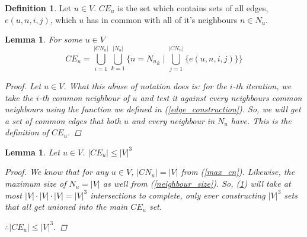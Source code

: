 \documentclass{article}
\theoremstyle{plain}
\newtheorem{lem}[thm]{Lemma}
\theoremstyle{definition}
\newtheorem{defn}{Definition}[]
\theoremstyle{remark}
\newcommand{\cn}[1]{ {{CN}_{#1}} }
\newcommand{\ce}[1]{ {{CE}_{#1}} }
\newcommand{\nev}[1]{ {N_{#1}} }
\begin{document}
\begin{defn}
    Let \(u \in V\). \(\ce{u}\) is the set which contains sets of all edges,
    \(e(u, n, i ,j)\), which \(u\) has in common with all of it's neighbours
    \(n \in \nev{u}\).
\end{defn}

\begin{lem}
    For some \(u \in V\)
    \begin{equation}
        \ce{u} = \bigcup_{i=1}^{|\cn{u}|}
            \bigcup_{k=1}^{|\nev{u}|}
                \{ n = \nev{u}_k \mid
                \bigcup_{j=1}^{|\cn{n}|} \{ e(u, n, i, j) \} \}
    \end{equation}
    \begin{proof}
        Let \(u \in V\). What this abuse of notation does is: for the \(i\)-th iteration,
        we take the \(i\)-th common neighbour of \(u\) and test it against every neighbours
        common neighbours using the function we defined in (\ref{edge_construction}). So,
        we will get a set of common edges that both \(u\) and every neighbour in
        \(\nev{u}\) have. This is the definition of \(\ce{u}\).
    \end{proof}
    \label{ce_construct}
\end{lem}

\begin{lem}
    Let \(u \in V\). \(|\ce{u}| \leq |V|^3 \)
    \begin{proof}
        We know that for any \(u \in V\), \(|\cn{u}| = |V|\) from (\ref{max_cn}). Likewise,
        the maximum size of \(\nev{u} = |V|\) as well from (\ref{neighbour_size}). So,
        (\ref{ce_construct}) will take at most \(|V| \cdot |V| \cdot |V| = |V|^3\)
        intersections to complete, only ever constructing \(|V|^3\) sets that all get
        unioned into the main \(\ce{u}\) set.

        \(\therefore |\ce{u}| \leq |V|^3\).
    \end{proof}
    \label{max_ce}
\end{lem}
\end{document}
